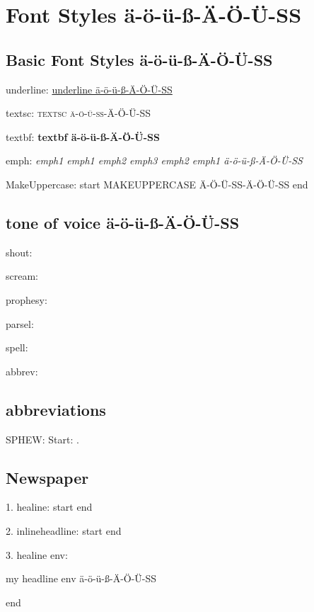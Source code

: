 \chapter{Font Styles ä-ö-ü-ß-Ä-Ö-Ü-SS}

\section{Basic Font Styles ä-ö-ü-ß-Ä-Ö-Ü-SS}

underline: \underline{underline ä-ö-ü-ß-Ä-Ö-Ü-SS}

textsc: \textsc{textsc ä-ö-ü-ß-Ä-Ö-Ü-SS}

textbf: \textbf{textbf ä-ö-ü-ß-Ä-Ö-Ü-SS}

emph: \emph{emph1 emph1 \emph{emph2 \emph{emph3} emph2} emph1 ä-ö-ü-ß-Ä-Ö-Ü-SS}

MakeUppercase: start \MakeUppercase{MakeUppercase ä-ö-ü-ß-Ä-Ö-Ü-SS} end

\section{tone of voice ä-ö-ü-ß-Ä-Ö-Ü-SS}

shout: 

scream: 

prophesy: 

parsel: 

spell: 

abbrev: 

\section{abbreviations}
SPHEW: Start: \SPHEW.

\section{Newspaper}

1. healine: start  end

2. inlineheadline: start  end

3. healine env:
\begin{headlines}
my headline env ä-ö-ü-ß-Ä-Ö-Ü-SS
\end{headlines}
end

